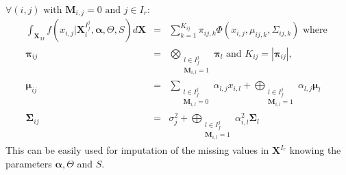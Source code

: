 \documentclass[11pt,a4paper]{report}
\begin{document}
	 $\forall (i,j) \textrm{ with } \boldsymbol{M}_{i,j}= 0 \textrm{ and } j \in I_r $:
		\begin{eqnarray}
 \int_{\boldsymbol{X}_M}f(x_{i,j}|\boldsymbol{X}_i^{I_f^j},\boldsymbol{\alpha},\Theta,S) d\boldsymbol{X}&=& \sum_{k=1}^{K_{ij}}\pi_{ij,k}\Phi(x_{i,j},\mu_{ij,k},\Sigma_{ij,k}) \textrm{ where }  \label{Missingdensity}\\
				\boldsymbol{\pi}_{ij} &=& \bigotimes_{\substack{l \in I_f^j \\ \boldsymbol{M}_{i,l}=1 } } \boldsymbol{\pi}_l \textrm{ and  }K_{ij}=|\boldsymbol{\pi}_{ij}| ,\\
				\boldsymbol{\mu}_{ij}&=& \sum_{\substack{l \in I_f^j \\ \boldsymbol{M}_{i,l}=0  }}\alpha_{l,j}x_{i,l} + \bigoplus_{\substack{l \in I_f^j \\ \boldsymbol{M}_{i,l}=1  }} \alpha_{l,j} \boldsymbol{\mu}_l \\
				\boldsymbol{\Sigma}_{ij} &=& \sigma_j^2 + \bigoplus_{\substack{l \in I_f^j \\ \boldsymbol{M}_{i,l}=1 }}\alpha_{i,l}^2 \boldsymbol{\Sigma}_l		
		\end{eqnarray}		 
		This can be easily used for imputation of the missing values in $\boldsymbol{X}^{I_r}$ knowing the parameters $\boldsymbol{\alpha}, \Theta$ and $S$. 
%		
\end{document}
